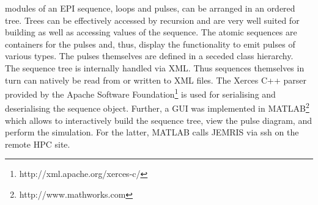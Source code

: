 \documentclass{nic-series}
\begin{document}
modules of an EPI sequence, loops and pulses, can be arranged in an
ordered tree. Trees can be effectively accessed by
recursion and are very well suited for building as well as
accessing values of the sequence. The atomic sequences are containers
for the pulses and, thus, display the functionality to emit pulses of
various types. The pulses themselves are defined in a seceded class hierarchy. 
\\
The sequence tree is internally handled via XML. Thus sequences
themselves in turn can natively be read from or written to XML files. 
The Xerces C++ parser provided by the Apache Software Foundation\footnote{\sf
http://xml.apache.org/xerces-c/} is used for serialising and
deserialising the sequence object. Further, a GUI was implemented in
MATLAB\footnote{\sf http://www.mathworks.com} which allows to
interactively build the sequence tree, view the pulse diagram, and
perform the simulation. For the latter, MATLAB calls JEMRIS via {\sf
ssh} on the remote HPC site.
\end{document}
